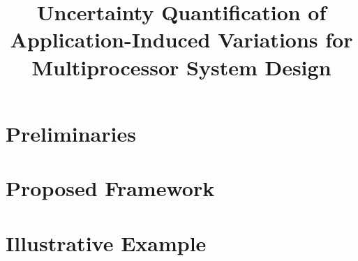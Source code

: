 \documentclass{sig-alternate}
\begin{document}
  \title{Uncertainty Quantification of Application-Induced Variations for Multiprocessor System Design}

  \maketitle

  \begin{abstract}
    
  \end{abstract}

  \section{Preliminaries}
  

  \section{Proposed Framework}
  

  \section{Illustrative Example}
  

  \printbibliography
\end{document}
